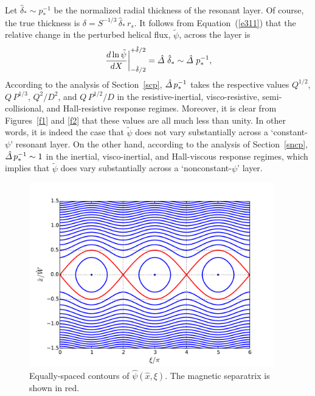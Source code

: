 \documentclass[notitlepage,12pt]{article}
\begin{document}
Let $\hat{\delta}_\ast\sim p_\ast^{-1}$ be the normalized radial thickness of the resonant layer.  Of course, the true thickness is
$\delta = S^{-1/3}\,\hat{\delta}_\ast\,r_s$.  It follows from
Equation~(\ref{e311}) that the relative change in the perturbed helical flux, $\tilde{\psi}$, across the layer
is
\begin{equation}
\left.\frac{d\ln\tilde{\psi}}{dX}\right|_{-\hat{\delta}/2}^{+\hat{\delta}/2} = \hat{\mit\Delta}\,\,\hat{\delta}_\ast\sim \hat{\mit\Delta}\,\,p_\ast^{-1},
\end{equation}
According to the  analysis of Section~\ref{scp}, $\hat{\mit\Delta}\,p_\ast^{-1}$ takes the respective values $Q^{1/2}$, $Q\,P^{1/3}$, 
$Q^2/D^2$, and $Q\,P^{1/2}/D$ in the resistive-inertial, visco-resistive, semi-collisional, and
Hall-resistive response regimes. Moreover, it is clear from Figures~\ref{f1} and \ref{f2} that these values are all
much less than unity. In other words, it is indeed the case that $\tilde{\psi}$ does not vary substantially across a
`constant-$\psi$' resonant layer. On the other hand, according to the analysis of Section~\ref{sncp}, $\hat{\mit\Delta}\,p_\ast^{-1}\sim 1$ in the inertial,
visco-inertial, and Hall-viscous response regimes, which implies that $\tilde{\psi}$ does vary substantially
across a `nonconstant-$\psi$' layer. 

\begin{figure}[t]
\centerline{\includegraphics[width=0.95\textwidth]{Island.pdf}}
\caption{Equally-spaced contours of $\hat{\psi}(\hat{x},\xi)$. The magnetic separatrix is shown in red. }\label{f2a}
\end{figure}
\end{document}
